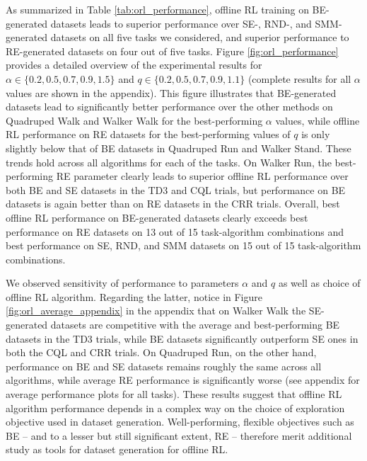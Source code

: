 As summarized in Table \ref{tab:orl_performance}, offline RL training on BE-generated datasets leads to superior performance over SE-, RND-, and SMM-generated datasets on all five tasks we considered, and superior performance to RE-generated datasets on four out of five tasks. Figure \ref{fig:orl_performance} provides a detailed overview of the experimental results for $\alpha \in \{0.2, 0.5, 0.7, 0.9, 1.5\}$ and $q \in \{0.2, 0.5, 0.7, 0.9, 1.1\}$ (complete results for all $\alpha$ values are shown in the appendix). This figure illustrates that BE-generated datasets lead to significantly better performance over the other methods on Quadruped Walk and Walker Walk for the best-performing $\alpha$ values, while offline RL performance on RE datasets for the best-performing values of $q$ is only slightly below that of BE datasets in Quadruped Run and Walker Stand. These trends hold across all algorithms for each of the tasks. On Walker Run, the best-performing RE parameter clearly leads to superior offline RL performance over both BE and SE datasets in the TD3 and CQL trials, but performance on BE datasets is again better than on RE datasets in the CRR trials.  Overall, best offline RL performance on BE-generated datasets clearly exceeds best performance on RE datasets on 13 out of 15 task-algorithm combinations and best performance on SE, RND, and SMM datasets on 15 out of 15 task-algorithm combinations.

We observed sensitivity of performance to parameters $\alpha$ and $q$ as well as choice of offline RL algorithm. Regarding the latter, notice in Figure \ref{fig:orl_average_appendix} in the appendix that on Walker Walk the SE-generated datasets are competitive with the average and best-performing BE datasets in the TD3 trials, while BE datasets significantly outperform SE ones in both the CQL and CRR trials. On Quadruped Run, on the other hand, performance on BE and SE datasets remains roughly the same across all algorithms, while average RE performance is significantly worse (see appendix for average performance plots for all tasks). These results suggest that offline RL algorithm performance depends in a complex way on the choice of exploration objective used in dataset generation. Well-performing, flexible objectives such as BE -- and to a lesser but still significant extent, RE -- therefore merit additional study as tools for dataset generation for offline RL.